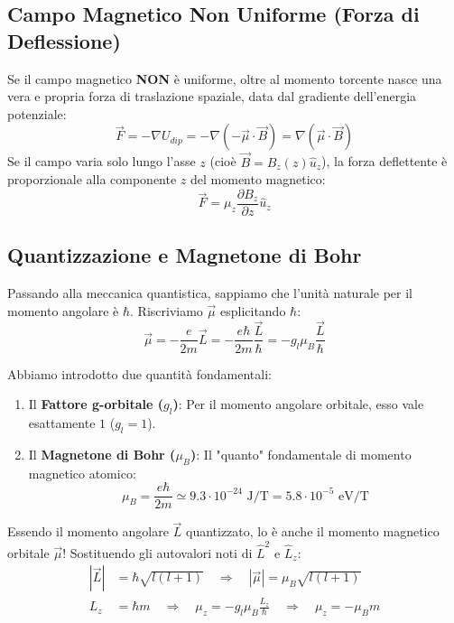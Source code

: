 \documentclass[11pt, a4paper]{article}
\begin{document}
\subsection{Campo Magnetico Non Uniforme (Forza di Deflessione)} %

Se il campo magnetico \textbf{NON} è uniforme, oltre al momento torcente nasce una vera e propria forza di traslazione spaziale, data dal gradiente dell'energia potenziale: %
\begin{equation*}
    \vec{F} = -\nabla U_{dip} = -\nabla(-\vec{\mu} \cdot \vec{B}) = \nabla(\vec{\mu} \cdot \vec{B}) %
\end{equation*}
Se il campo varia solo lungo l'asse $z$ (cioè $\vec{B} = B_z(z)\hat{u}_z$), la forza deflettente è proporzionale alla componente $z$ del momento magnetico: %
\begin{equation}
    \vec{F} = \mu_z \frac{\partial B_z}{\partial z} \hat{u}_z %
\end{equation}

\subsection{Quantizzazione e Magnetone di Bohr} %

Passando alla meccanica quantistica, sappiamo che l'unità naturale per il momento angolare è $\hbar$. Riscriviamo $\vec{\mu}$ esplicitando $\hbar$: %
\begin{equation*}
    \vec{\mu} = -\frac{e}{2m}\vec{L} = -\frac{e\hbar}{2m} \frac{\vec{L}}{\hbar} = -g_l \mu_B \frac{\vec{L}}{\hbar} %
\end{equation*}

Abbiamo introdotto due quantità fondamentali: %
\begin{enumerate}
    \item Il \textbf{Fattore g-orbitale ($g_l$)}: Per il momento angolare orbitale, esso vale esattamente $1$ ($g_l = 1$). %
    \item Il \textbf{Magnetone di Bohr ($\mu_B$)}: Il "quanto" fondamentale di momento magnetico atomico: %
    \begin{equation}
        \boxed{ \mu_B = \frac{e\hbar}{2m} \simeq 9.3 \cdot 10^{-24} \text{ J/T} = 5.8 \cdot 10^{-5} \text{ eV/T} } %
    \end{equation}
\end{enumerate}

\noindent
Essendo il momento angolare $\vec{L}$ quantizzato, lo è anche il momento magnetico orbitale $\vec{\mu}$! Sostituendo gli autovalori noti di $\hat{L}^2$ e $\hat{L}_z$: %
\begin{align}
    |\vec{L}| &= \hbar \sqrt{l(l+1)} \quad \Rightarrow \quad \boxed{ |\vec{\mu}| = \mu_B \sqrt{l(l+1)} } \\ %
    L_z &= \hbar m \quad \Rightarrow \quad \mu_z = -g_l \mu_B \frac{L_z}{\hbar} \quad \Rightarrow \quad \boxed{ \mu_z = -\mu_B m } %
\end{align}
\end{document}
